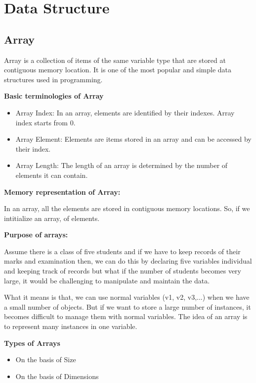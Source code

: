 \section{Data Structure}

\subsection{Array}
Array is a collection of items of the same variable type that are stored
at contiguous memory location. It is one of the most popular and simple
data structures used in programming.

\textbf{Basic terminologies of Array}

\begin{itemize}
    \item Array Index: In an array, elements are identified by their
        indexes. Array index starts from 0.
    \item Array Element: Elements are items stored in an array and can
        be accessed by their index.
    \item Array Length: The length of an array is determined by the
        number of elements it can contain.
\end{itemize}

\textbf{Memory representation of Array:}

In an array, all the elements are stored in contiguous memory locations.
So, if we intitialize an array, of elements.

\textbf{Purpose of arrays:}

Assume there is a class of five students and if we have to keep records
of their marks and examination then, we can do this by declaring five
variables individual and keeping track of records but what if the number
of students becomes very large, it would be challenging to manipulate
and maintain the data.

What it means is that, we can use normal variables (v1, v2, v3,...)
when we have a small number of objects. But if we want to store a large
number of instances, it becomes difficult to manage them with normal
variables. The idea of an array is to represent many instances in one
variable.

\textbf{Types of Arrays}

\begin{itemize}
    \item On the basis of Size
    \item On the basis of Dimensions
\end{itemize}

